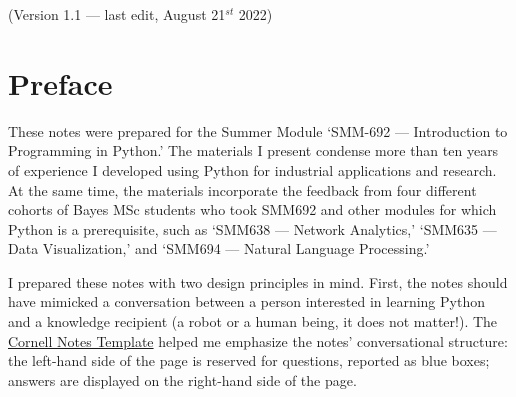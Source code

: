 \documentclass[a4paper,11pt]{book}
\begin{document}

\vspace{9em}
\centering (Version 1.1 --- last edit, August 21$^{st}$ 2022)
\clearpage

\tableofcontents

\listoffigures

\listoftables

\clearpage

\chapter*{Preface}

\raggedright These notes were prepared for the Summer Module `SMM-692 --- Introduction to Programming in Python.' The materials I present condense more than ten years of experience I developed using Python for industrial applications and research. At the same time, the materials incorporate the feedback from four different cohorts of Bayes MSc students who took SMM692 and other modules for which Python is a prerequisite, such as `SMM638 --- Network Analytics,' `SMM635 --- Data Visualization,' and `SMM694 --- Natural Language Processing.' 

\quad I prepared these notes with two design principles in mind. First, the notes should have mimicked a conversation between a person interested in learning Python and a knowledge recipient (a robot or a human being, it does not matter!).  The \href{https://en.wikipedia.org/wiki/Cornell_Notes}{Cornell Notes Template} helped me emphasize the notes' conversational structure: the left-hand side of the page is reserved for questions, reported as blue boxes; answers are displayed on the right-hand side of the page.
\end{document}
